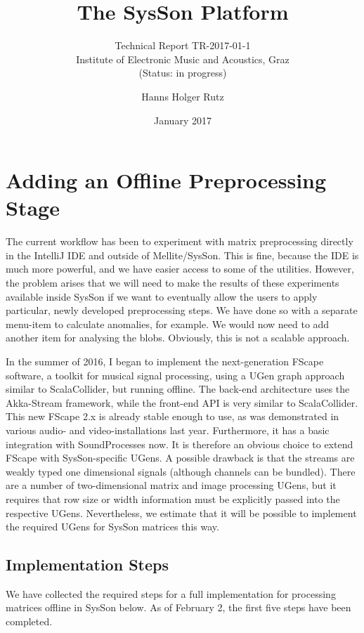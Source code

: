 \documentclass[11pt,a4paper]{article}
\title{The SysSon Platform}
\subtitle{Technical Report TR-2017-01-1\\Institute of Electronic Music and Acoustics, Graz\\(Status: in progress)}
\author{Hanns Holger Rutz}
\date{January 2017}
\begin{document}
\maketitle
{}
\thispagestyle{empty}
\newpage
\section{Adding an Offline Preprocessing Stage}

The current workflow has been to experiment with matrix preprocessing directly in the IntelliJ IDE and outside of Mellite/SysSon. This is fine, because the IDE is much more powerful, and we have easier access to some of the utilities. However, the problem arises that we will need to make the results of these experiments available inside SysSon if we want to eventually allow the users to apply particular, newly developed preprocessing steps. We have done so with a separate menu-item to calculate anomalies, for example. We would now need to add another item for analysing the blobs. Obviously, this is not a scalable approach.

In the summer of 2016, I began to implement the next-generation FScape software, a toolkit for musical signal processing, using a UGen graph approach similar to ScalaCollider, but running offline. The back-end architecture uses the Akka-Stream framework, while the front-end API is very similar to ScalaCollider. This new FScape 2.x is already stable enough to use, as was demonstrated in various audio- and video-installations last year. Furthermore, it has a basic integration with SoundProcesses now. It is therefore an obvious choice to extend FScape with SysSon-specific UGens. A possible drawback is that the streams are weakly typed one dimensional signals (although channels can be bundled). There are a number of two-dimensional matrix and image processing UGens, but it requires that row size or width information must be explicitly passed into the respective UGens. Nevertheless, we estimate that it will be possible to implement the required UGens for SysSon matrices this way.

\subsection{Implementation Steps}

We have collected the required steps for a full implementation for processing matrices offline in SysSon below. As of February 2, the first five steps have been completed.
\end{document}
